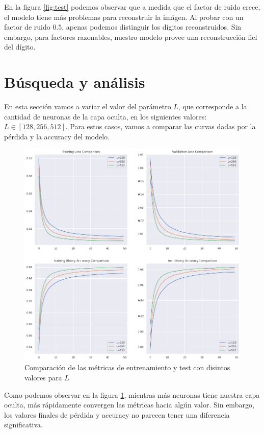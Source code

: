 \documentclass[a4paper,12pt,oneside,final]{article}
\begin{document}
En la figura \ref{fig:test} podemos observar que a medida que el factor de ruido crece, el modelo tiene más problemas para reconstruir la imágen. Al probar con un factor de ruido $0.5$, apenas podemos distinguir los dígitos reconstruidos. Sin embargo, para factores razonables, nuestro modelo provee una reconstrucción fiel del dígito. 

\section{Búsqueda y análisis}

En esta sección vamos a variar el valor del parámetro $L$, que corresponde a la cantidad de neuronas de la capa oculta, en los siguientes valores: $L \in [128, 256, 512]$. Para estos casos, vamos a comparar las curvas dadas por la pérdida y la accuracy del modelo.

\pagebreak

\begin{figure}[ht]
  \centering
  \includegraphics[width=15cm,keepaspectratio]{./graficos/metrics_comparison.png}
  \caption{Comparación de las métricas de entrenamiento y test con disintos valores para $L$}\label{fig:metrics_comparison}
\end{figure}

Como podemos observar en la figura \ref{fig:metrics_comparison}, mientras más neuronas tiene nuestra capa oculta, más rápidamente convergen las métricas hacia algún valor. Sin embargo, los valores finales de pérdida y accuracy no parecen tener una diferencia significativa.
\end{document}
